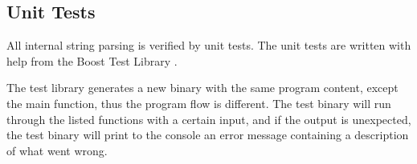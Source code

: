 \subsection{Unit Tests}

All internal string parsing is verified by unit tests. The unit tests
are written with help from the Boost Test Library \cite{boostunittest}.

The test library generates a new binary with the same program content, except the
main function, thus the program flow is different. The test binary will
run through the listed functions with a certain input, and if the output is unexpected,
the test binary will print to the console an error message containing a description of what
went wrong.

